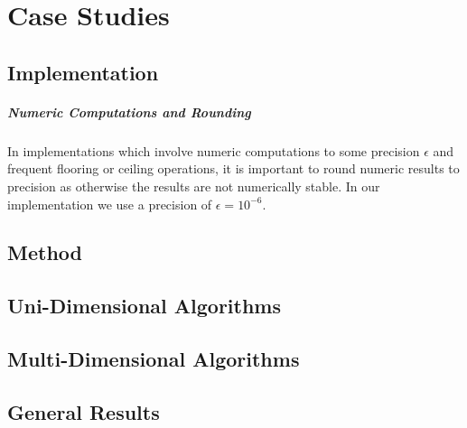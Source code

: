 
\chapter{Case Studies}\label{chapter:experiments}

\section{Implementation}

\paragraph{Numeric Computations and Rounding} In implementations which involve numeric computations to some precision $\epsilon$ and frequent flooring or ceiling operations, it is important to round numeric results to precision as otherwise the results are not numerically stable. In our implementation we use a precision of $\epsilon = 10^{-6}$.

\section{Method}

\section{Uni-Dimensional Algorithms}

\section{Multi-Dimensional Algorithms}

\section{General Results}
